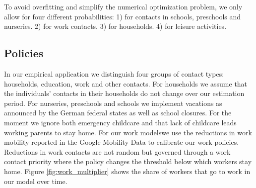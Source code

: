 To avoid overfitting and simplify the numerical optimization problem, we only allow for
four different probabilities: 1) for contacts in schools, preschools and nurseries. 2)
for work contacts. 3) for households. 4) for leisure activities.

\subsection{Policies}

\FloatBarrier

In our empirical application we distinguish four groups of contact types: households,
education, work and other contacts. For households we assume that the individuals'
contacts in their households do not change over our estimation period. For nurseries,
preschools and schools we implement vacations as announced by the German federal states
as well as school closures. For the moment we ignore both emergency childcare and that
lack of childcare leads working parents to stay home.
%
%
%
%
For our work models\footnotemark we use the reductions in work mobility reported in the
Google Mobility Data \citep{Google2021} to calibrate our work policies.
Reductions in work contacts are not random but governed through a work contact priority
where the policy changes the threshold below which workers stay home.
Figure \ref{fig:work_multiplier} shows the share of workers that go to work in our model
over time.

